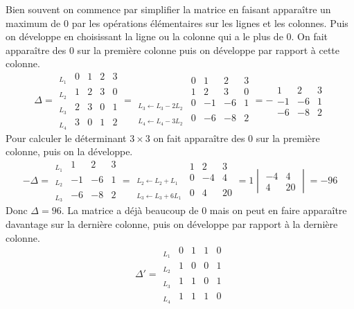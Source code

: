 {{Bien souvent on commence par simplifier la matrice en faisant apparaître un maximum de $0$
par les opérations élémentaires sur les lignes et les colonnes. Puis on développe en choisissant 
la ligne ou la colonne qui a le plus de $0$.
On fait apparaître des $0$ sur la première colonne puis on développe par rapport à cette colonne.
$$\Delta = \begin{array}{l|cccc|} 
_{L_1} & 0 & 1 & 2 & 3 \\ _{L_2} & 1 & 2 & 3 & 0 \\ _{L_3} & 2 & 3 & 0 & 1 \\ _{L_4} & 3 & 0 & 1 & 2 \end{array}
=  \begin{array}{l|cccc|}& 0 & 1 & 2 & 3\\  & 1 & 2 & 3 & 0\\ _{L_3 \leftarrow L_3 -2 L_2} & 0 & -1 & -6 & 1\\ _{L_4\leftarrow L_4 -3 L_2} & 0 & -6 & -8 & 2\end{array}
= - \begin{array}{|ccc|}  1 & 2 & 3\\  -1 & -6 & 1\\  -6 & -8 & 2\end{array}
$$
Pour calculer le déterminant $3\times 3$ on fait apparaître des $0$ sur la première colonne, puis on la développe.
$$-\Delta = \begin{array}{l|ccc|} _{L_1} & 1 & 2 & 3\\ _{L_2} & -1 & -6 & 1\\ _{L_3} & -6 & -8 & 2\end{array}
= \begin{array}{l|ccc|}  & 1 & 2 & 3\\ _{L_2\leftarrow L_2+L_1} & 0 & -4 & 4\\ _{L_3\leftarrow L_3+6L_1} & 0 & 4 & 20\end{array}
=1\begin{vmatrix}-4 & 4 \\ 4 & 20\end{vmatrix} = -96
$$
Donc $\Delta=96$.
La matrice a déjà beaucoup de $0$ mais on peut en faire apparaître davantage sur la dernière colonne, puis on développe par rapport à la dernière colonne.
$$
\Delta'= \begin{array}{l|cccc|} 
_{L_1} & 0 & 1 & 1 & 0\\ _{L_2} & 1 & 0 & 0 & 1\\ _{L_3} & 1 & 1 & 0 & 1\\  _{L_4} & 1 & 1 & 1 &0  

\end{array}$$}}
